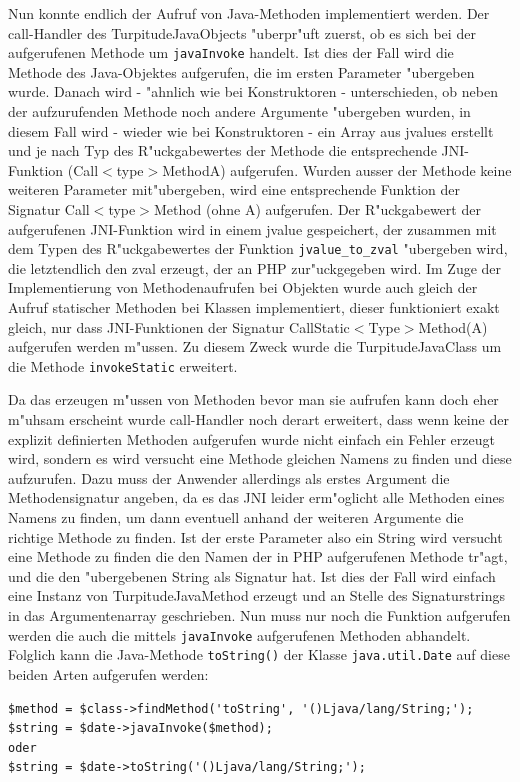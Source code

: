 Nun konnte endlich der Aufruf von Java-Methoden implementiert werden. Der call-Handler des TurpitudeJavaObjects "uberpr"uft zuerst, ob es sich bei der
aufgerufenen Methode um \texttt{javaInvoke} handelt. Ist dies der Fall wird die Methode des Java-Objektes aufgerufen, die im ersten Parameter "ubergeben 
wurde. Danach wird - "ahnlich wie bei Konstruktoren - unterschieden, ob neben der aufzurufenden Methode noch andere Argumente "ubergeben wurden, in diesem
Fall wird - wieder wie bei Konstruktoren - ein Array aus jvalues erstellt und je nach Typ des R"uckgabewertes der Methode die entsprechende JNI-Funktion
(Call$<$type$>$MethodA) aufgerufen. Wurden ausser der Methode keine weiteren Parameter mit"ubergeben, wird eine entsprechende Funktion der Signatur
Call$<$type$>$Method (ohne A) aufgerufen. Der R"uckgabewert der aufgerufenen JNI-Funktion wird in einem jvalue gespeichert, der zusammen mit dem
Typen des R"uckgabewertes der Funktion \texttt{jvalue\_to\_zval} "ubergeben wird, die letztendlich den zval erzeugt, der an PHP zur"uckgegeben wird.
Im Zuge der Implementierung von Methodenaufrufen bei Objekten wurde auch gleich der Aufruf statischer Methoden bei Klassen implementiert, dieser funktioniert exakt 
gleich, nur dass JNI-Funktionen der Signatur CallStatic$<$Type$>$Method(A) aufgerufen werden m"ussen. Zu diesem Zweck wurde die TurpitudeJavaClass um die Methode
\texttt{invokeStatic} erweitert.

Da das erzeugen m"ussen von Methoden bevor man sie aufrufen kann doch eher m"uhsam erscheint wurde call-Handler noch derart erweitert, dass wenn keine der
explizit definierten Methoden aufgerufen wurde nicht einfach ein Fehler erzeugt wird, sondern es wird versucht eine Methode gleichen Namens zu finden und diese
aufzurufen. Dazu muss der Anwender allerdings als erstes Argument die Methodensignatur angeben, da es das JNI leider erm"oglicht alle Methoden eines Namens
zu finden, um dann eventuell anhand der weiteren Argumente die richtige Methode zu finden. Ist der erste Parameter also ein String wird versucht eine
Methode zu finden die den Namen der in PHP aufgerufenen Methode tr"agt, und die den "ubergebenen String als Signatur hat. Ist dies der Fall wird einfach 
eine Instanz von TurpitudeJavaMethod erzeugt und an Stelle des Signaturstrings in das Argumentenarray geschrieben. Nun muss nur noch die Funktion aufgerufen
werden die auch die mittels \texttt{javaInvoke} aufgerufenen Methoden abhandelt. Folglich kann die Java-Methode \texttt{toString()} der Klasse \texttt{java.util.Date}
auf diese beiden Arten aufgerufen werden:
\begin{lstlisting}[caption=Zwei Arten die gleiche Methode aufzurufen]
$method = $class->findMethod('toString', '()Ljava/lang/String;');
$string = $date->javaInvoke($method);
oder
$string = $date->toString('()Ljava/lang/String;');
\end{lstlisting}

